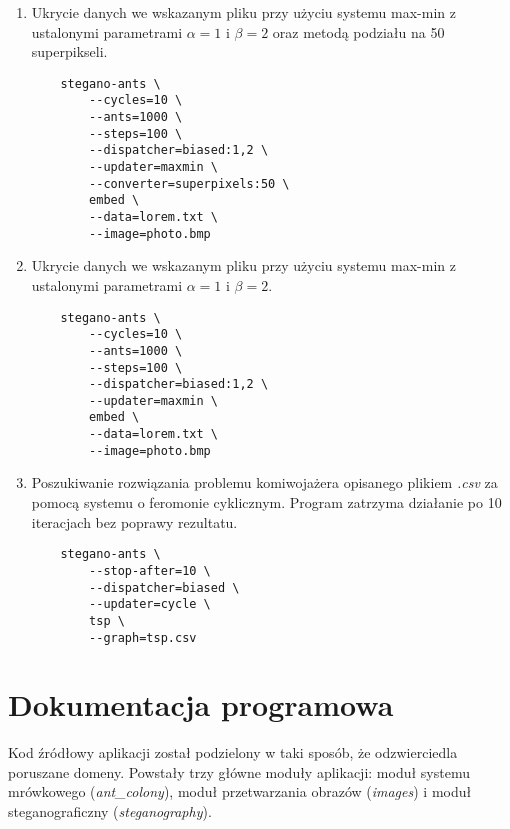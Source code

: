 {{{\begin{enumerate}
                \item Ukrycie danych we wskazanym pliku przy użyciu systemu max-min z ustalonymi parametrami $\alpha=1$
                i $\beta=2$ oraz metodą podziału na 50 superpikseli.

                \begin{lstlisting}
    stegano-ants \
        --cycles=10 \
        --ants=1000 \
        --steps=100 \
        --dispatcher=biased:1,2 \
        --updater=maxmin \
        --converter=superpixels:50 \
        embed \
        --data=lorem.txt \
        --image=photo.bmp
                \end{lstlisting}

                \item Ukrycie danych we wskazanym pliku przy użyciu systemu max-min z ustalonymi parametrami $\alpha=1$
                i $\beta=2$.

                \begin{lstlisting}
    stegano-ants \
        --cycles=10 \
        --ants=1000 \
        --steps=100 \
        --dispatcher=biased:1,2 \
        --updater=maxmin \
        embed \
        --data=lorem.txt \
        --image=photo.bmp
                \end{lstlisting}

                \item Poszukiwanie rozwiązania problemu komiwojażera opisanego plikiem \textit{.csv} za pomocą systemu o
                feromonie cyklicznym. Program zatrzyma działanie po 10 iteracjach bez poprawy rezultatu.

                \begin{lstlisting}
    stegano-ants \
        --stop-after=10 \
        --dispatcher=biased \
        --updater=cycle \
        tsp \
        --graph=tsp.csv
                \end{lstlisting}
            \end{enumerate}
        }
    }

    \section{Dokumentacja programowa}
    {
        Kod źródłowy aplikacji został podzielony w taki sposób, że odzwierciedla poruszane domeny. Powstały trzy główne
        moduły aplikacji: moduł systemu mrówkowego (\textit{ant\_colony}), moduł przetwarzania obrazów (\textit{images})
        i moduł steganograficzny (\textit{steganography}).


}}

